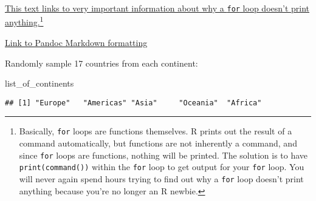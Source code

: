 \documentclass[]{article}
\newenvironment{Shaded}{\begin{snugshade}}{\end{snugshade}}
\newcommand{\CharTok}[1]{\textcolor[rgb]{0.31,0.60,0.02}{#1}}
\newcommand{\ControlFlowTok}[1]{\textcolor[rgb]{0.13,0.29,0.53}{\textbf{#1}}}
\newcommand{\KeywordTok}[1]{\textcolor[rgb]{0.13,0.29,0.53}{\textbf{#1}}}
\newcommand{\NormalTok}[1]{#1}
\newcommand{\OperatorTok}[1]{\textcolor[rgb]{0.81,0.36,0.00}{\textbf{#1}}}
\newcommand{\StringTok}[1]{\textcolor[rgb]{0.31,0.60,0.02}{#1}}
\let\rmarkdownfootnote\footnote%
\def\footnote{\protect\rmarkdownfootnote}
\begin{document}
\href{https://stackoverflow.com/questions/14987743/head-function-does-not-work-within-for-loop}{This
text links to very important information about why a \texttt{for} loop
doesn't print anything.}\footnote{Basically, \texttt{for} loops are
  functions themselves. R prints out the result of a command
  automatically, but functions are not inherently a command, and since
  \texttt{for} loops are functions, nothing will be printed. The
  solution is to have \texttt{print(command())} within the \texttt{for}
  loop to get output for your \texttt{for} loop. You will never again
  spend hours trying to find out why a \texttt{for} loop doesn't print
  anything because you're no longer an R newbie.}

\href{https://rmarkdown.rstudio.com/authoring_pandoc_markdown.html\%23raw-tex}{Link
to Pandoc Markdown formatting}

Randomly sample 17 countries from each continent:

\begin{Shaded}
\begin{Highlighting}[]
\NormalTok{list_of_continents}
\end{Highlighting}
\end{Shaded}

\begin{verbatim}
## [1] "Europe"   "Americas" "Asia"     "Oceania"  "Africa"
\end{verbatim}

\begin{Shaded}
\end{Shaded}
\end{document}
